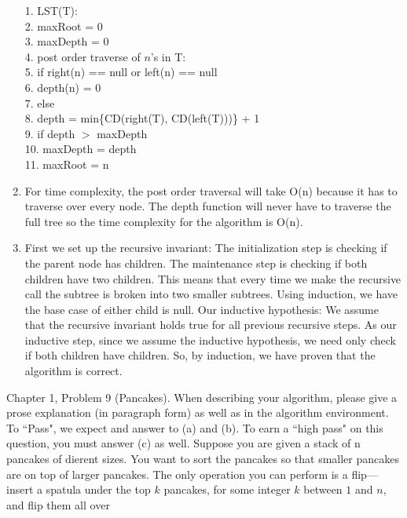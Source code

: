 \documentclass{article}
\begin{document}
\begin{enumerate}
\begin{algorithm}
    	1. LST(T): \\
    	2. \hspace{2em}	maxRoot = 0 \\
    	3. \hspace{2em}	maxDepth = 0 \\
    	4. \hspace{2em}	post order traverse of $n$'s in T: \\
    	5. \hspace{4em}		if right(n) == null or left(n) == null \\
    	6. \hspace{6em}			depth(n) = 0 \\
    	7. \hspace{4em}		else \\
    	8. \hspace{6em}			depth = min\{CD(right(T), CD(left(T)))\} + 1 \\
    	9. \hspace{6em}			if depth $>$ maxDepth \\
    	10.\hspace{8em}				maxDepth = depth \\
    	11.\hspace{8em}				maxRoot = n
    \end{algorithm}
    \newpage
	\item For time complexity, the post order traversal will take O(n) because it has to traverse over every node. The depth function will never have to traverse the full tree so the time complexity for the algorithm is O(n).
    \item First we set up the recursive invariant: The initialization step is checking if the parent node has children.
    The maintenance step is checking if both children have two children.
    This means that every time we make the recursive call the subtree is broken into two smaller subtrees.
    Using induction, we have the base case of either child is null.
    Our inductive hypothesis: We assume that the recursive invariant holds true for all previous recursive steps.
    As our inductive step, since we assume the inductive hypothesis, we need only check if both children have children.
    So, by induction, we have proven that the algorithm is correct.
\end{enumerate}


\nextprob
{}

Chapter 1, Problem 9 (Pancakes). When describing your algorithm, please give a
prose explanation (in paragraph form) as well as in the algorithm environment.
To ``Pass", we expect and answer to (a) and (b).  To earn a ``high pass" on this
question, you must answer (c) as well. \parspace
Suppose you are given a stack of n pancakes of dierent sizes.
You want to sort the pancakes so that smaller pancakes are on top of larger pancakes.
The only operation you can perform is a flip—insert a spatula under the top $k$ pancakes, for some integer $k$ between $1$ and $n$, and flip them all over
\end{document}
